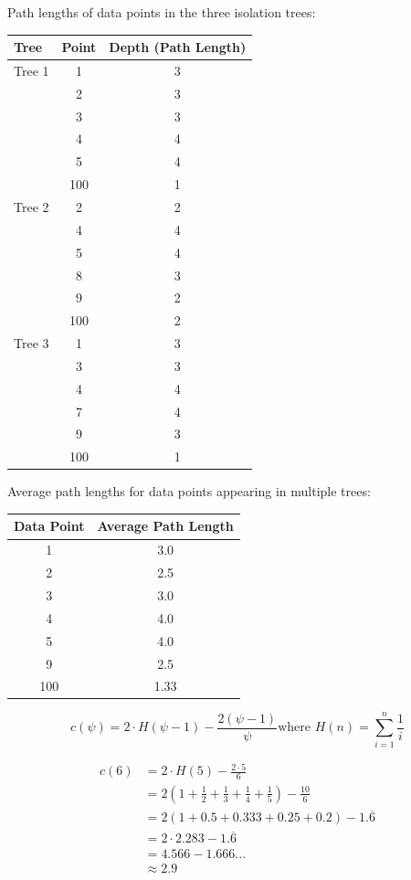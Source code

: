 \documentclass{article}
\begin{document}
Path lengths of data points in the three isolation trees:
\begin{table}[h]
\begin{tabular}{l c c}
\toprule
\textbf{Tree} & \textbf{Point} & \textbf{Depth (Path Length)} \\
\midrule
Tree 1 & 1   & 3 \\
       & 2   & 3 \\
       & 3   & 3 \\
       & 4   & 4 \\
       & 5   & 4 \\
       & 100 & 1 \\
\midrule
Tree 2 & 2   & 2 \\
       & 4   & 4 \\
       & 5   & 4 \\
       & 8   & 3 \\
       & 9   & 2 \\
       & 100 & 2 \\
\midrule
Tree 3 & 1   & 3 \\
       & 3   & 3 \\
       & 4   & 4 \\
       & 7   & 4 \\
       & 9   & 3 \\
       & 100 & 1 \\
\bottomrule
\end{tabular}
\end{table}

Average path lengths for data points appearing in multiple trees:
\begin{table}[h]
\begin{tabular}{c c}
\toprule
\textbf{Data Point} & \textbf{Average Path Length} \\
\midrule
1   & 3.0 \\
2   & 2.5 \\
3   & 3.0 \\
4   & 4.0 \\
5   & 4.0 \\
9   & 2.5 \\
100 & 1.33 \\
\bottomrule
\end{tabular}
\end{table}

\[
c(\psi) = 2 \cdot H(\psi - 1) - \frac{2(\psi - 1)}{\psi}
\text{where } H(n) = \sum_{i=1}^n \frac{1}{i}
\]

\[
\begin{aligned}
c(6) &= 2 \cdot H(5) - \frac{2 \cdot 5}{6} \\
     &= 2 \left(1 + \frac{1}{2} + \frac{1}{3} + \frac{1}{4} + \frac{1}{5} \right) - \frac{10}{6} \\
     &= 2 \left(1 + 0.5 + 0.333 + 0.25 + 0.2 \right) - 1.\overline{6} \\
     &= 2 \cdot 2.283 - 1.\overline{6} \\
     &= 4.566 - 1.666... \\
     &\approx 2.9
\end{aligned}
\]
\end{document}

